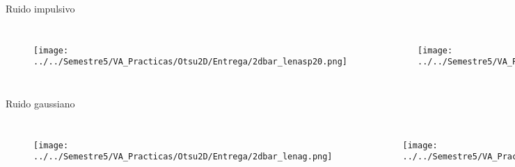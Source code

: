 \documentclass{beamer}
\begin{document}

\begin{frame}
Ruido impulsivo
\begin{columns}[t] %
\begin{figure}
\texttt{[image: ../../Semestre5/VA\_Practicas/Otsu2D/Entrega/2dbar\_lenasp20.png]}

\end{figure}

\begin{figure}
\texttt{[image: ../../Semestre5/VA\_Practicas/Otsu2D/Entrega/lena512sp20.png]}
\end{figure}

\end{columns}
\end{frame}

\begin{frame}
Ruido gaussiano
\begin{columns}[t] %
\begin{figure}
\texttt{[image: ../../Semestre5/VA\_Practicas/Otsu2D/Entrega/2dbar\_lenag.png]}

\end{figure}

\begin{figure}
\texttt{[image: ../../Semestre5/VA\_Practicas/Otsu2D/Entrega/lena512g.png]}
\end{figure}

\end{columns}
\end{frame}

\end{document}
